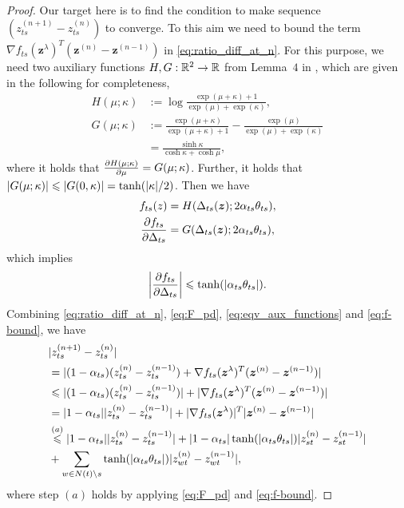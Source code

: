 \begin{proof}
  Our target here is to find the condition to make sequence $\left( z_{ts}^{(n+1)} - z_{ts}^{(n)} \right)$ to converge. To this aim we need to bound the term $\nabla f_{ts}(\bm{z}^{\lambda})^{T} (\bm{z}^{(n)} - \bm{z}^{(n-1)})$ in \eqref{eq:ratio_diff_at_n}. For this purpose, we need two auxiliary functions $H, G: \mathbb{R}^2 \rightarrow \mathbb{R}$ from Lemma~$4$ in \cite{roosta2008reweighed_sum_product}, which are given in the following for completeness,
  \begin{align}
    H(\mu; \kappa) &:= \log \frac{\exp(\mu + \kappa) +1}{\exp(\mu) + \exp(\kappa)}, \nonumber \\
    G(\mu; \kappa) &:= \frac{\exp(\mu + \kappa)}{\exp(\mu + \kappa) + 1} - \frac{\exp(\mu)}{\exp(\mu) + \exp(\kappa)} \nonumber \\
                   &= \frac{\sinh{\kappa}}{\cosh{\kappa} + \cosh{\mu}},
  \end{align}
  where it holds that $\frac{ \partial H(\mu; \kappa)}{\partial \mu} = G(\mu; \kappa)$. Further, it holds that
  $| G(\mu; \kappa) | \leqslant | G(0, \kappa) | = \tanh(| \kappa |/2)$.
  Then we have
  \begin{align}\label{eq:eqv_aux_functions}
    f_{ts}(z) &= H(\Delta_{ts}(\bm{z}) ;2 \alpha_{ts} \theta_{ts}), \nonumber \\
    \frac{ \partial f_{ts}}{\partial \Delta_{ts}} &= G(\Delta_{ts}(\bm{z}) ;2 \alpha_{ts} \theta_{ts}),
  \end{align}
  which implies
  \begin{equation}\label{eq:f-bound}
    \bigg|{\frac{ \partial f_{ts}}{\partial \Delta_{ts}}}\bigg| \leqslant \tanh(| \alpha_{ts}\theta_{ts} |).
  \end{equation}
  Combining \eqref{eq:ratio_diff_at_n}, \eqref{eq:F_pd}, \eqref{eq:eqv_aux_functions} and \eqref{eq:f-bound}, we have
  \begin{align}\label{eq:ratio_cvg_step}
    &| z_{ts}^{(n+1)} - z_{ts}^{(n)} | \nonumber\\
    & = | (1-\alpha_{ts}) (z_{ts}^{(n)} - z_{ts}^{(n-1)}) + \nabla f_{ts}(\bm{z}^{\lambda})^{T} (\bm{z}^{(n)} - \bm{z}^{(n-1)}) | \nonumber \\
    & \leqslant | (1-\alpha_{ts}) (z_{ts}^{(n)} - z_{ts}^{(n-1)}) | + | \nabla f_{ts}(\bm{z}^{\lambda})^{T} (\bm{z}^{(n)} - \bm{z}^{(n-1)}) | \nonumber \\
    & = |  1 - \alpha_{ts} | | z_{ts}^{(n)} - z_{ts}^{(n-1)} | + | \nabla f_{ts}(\bm{z}^{\lambda}) |^{T} | \bm{z}^{(n)} - \bm{z}^{(n-1)} | \nonumber \\
    & \overset{(a)}{\leqslant} |  1 - \alpha_{ts} | | z_{ts}^{(n)} - z_{ts}^{(n-1)} | + |  1 - \alpha_{ts} | \tanh(| \alpha_{ts} \theta_{ts} |) | z_{st}^{(n)} - z_{st}^{(n-1)} | \nonumber \\
    &+ \sum_{w\in N(t)\backslash s} \tanh(| \alpha_{ts} \theta_{ts} |) | z_{wt}^{(n)} - z_{wt}^{(n-1)} |,
  \end{align}
  where step $(a)$ holds by applying \eqref{eq:F_pd} and \eqref{eq:f-bound}.


\end{proof}
